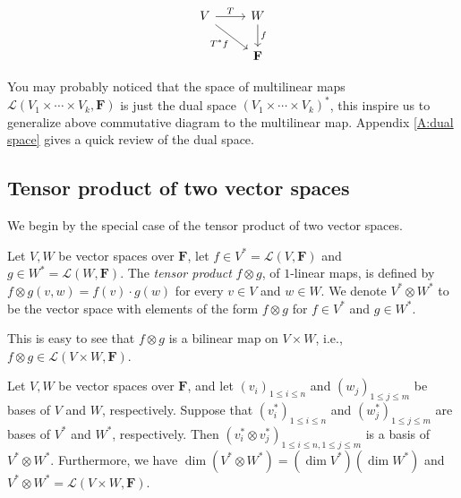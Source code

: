 \[
  \begin{tikzcd}
    V \arrow{r}{T} \arrow[swap]{dr}{T^*f} & W \arrow{d}{f} \\
     & \mathbf{F}
  \end{tikzcd}
\]

You may probably noticed that the space of multilinear maps $\mathcal{L}(V_1\times\cdots\times V_k, \mathbf{F})$ is just the dual space $(V_1 \times \cdots \times V_k)^*$, this inspire us to generalize above commutative diagram to the multilinear map. Appendix \ref{A:dual space} gives a quick review of the dual space.

\subsection{Tensor product of two vector spaces}

We begin by the special case of the tensor product of two vector spaces.

\begin{definition}
    Let $V,W$ be vector spaces over $\mathbf{F}$, let $f \in V^* = \mathcal{L}(V, \mathbf{F})$ and $g \in W^* = \mathcal{L}(W, \mathbf{F})$. The \emph{tensor product} $f \otimes g$, of $1$-linear maps, is defined by $f \otimes g(v, w) = f(v)\cdot g(w)$ for every $v \in V$ and $w \in W$. We denote $V^* \otimes W^*$ to be the vector space with elements of the form $f \otimes g$ for $f \in V^*$ and $g \in W^*$.
\end{definition}

This is easy to see that $f \otimes g$ is a bilinear map on $V \times W$, i.e., $f \otimes g \in \mathcal{L}(V \times W, \mathbf{F})$.

\begin{lemma}\label{lem:basis, dimension of tensor product}
    Let $V, W$ be vector spaces over $\mathbf{F}$, and let $(v_i)_{1 \leq i \leq n}$ and $(w_j)_{1 \leq j \leq m}$ be bases of $V$ and $W$, respectively. Suppose that $(v_i^*)_{1 \leq i \leq n}$ and $(w_j^*)_{1 \leq j \leq m}$ are bases of $V^*$ and $W^*$, respectively. Then $(v_i^* \otimes v_j^*)_{1 \leq i \leq n, 1 \leq j \leq m}$ is a basis of $V^* \otimes W^*$. Furthermore, we have $\dim(V^* \otimes W^*) = (\dim{V^*})(\dim{W^*})$ and $V^* \otimes W^* = \mathcal{L}(V \times W, \mathbf{F})$.
\end{lemma}

